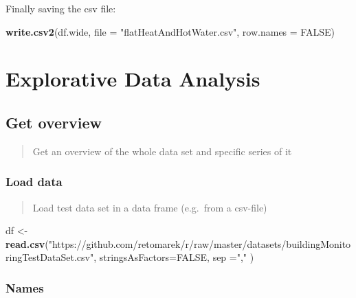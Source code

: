 \documentclass[
]{book}
\newenvironment{Shaded}{\begin{snugshade}}{\end{snugshade}}
\newcommand{\DataTypeTok}[1]{\textcolor[rgb]{0.13,0.29,0.53}{#1}}
\newcommand{\KeywordTok}[1]{\textcolor[rgb]{0.13,0.29,0.53}{\textbf{#1}}}
\newcommand{\NormalTok}[1]{#1}
\newcommand{\OtherTok}[1]{\textcolor[rgb]{0.56,0.35,0.01}{#1}}
\newcommand{\StringTok}[1]{\textcolor[rgb]{0.31,0.60,0.02}{#1}}
\let\oldShaded\Shaded
\let\endoldShaded\endShaded
\renewenvironment{Shaded}{\footnotesize\oldShaded}{\endoldShaded}
\begin{document}
Finally saving the csv file:

\begin{Shaded}
\begin{Highlighting}[]
\KeywordTok{write.csv2}\NormalTok{(df.wide,}
           \DataTypeTok{file =} \StringTok{"flatHeatAndHotWater.csv"}\NormalTok{,}
           \DataTypeTok{row.names =} \OtherTok{FALSE}\NormalTok{)}
\end{Highlighting}
\end{Shaded}

\hypertarget{explorative-data-analysis}{%
\chapter{Explorative Data Analysis}\label{explorative-data-analysis}}

\hypertarget{get-overview}{%
\section{Get overview}\label{get-overview}}

\begin{quote}
Get an overview of the whole data set and specific series of it
\end{quote}

\hypertarget{load-data}{%
\subsection{Load data}\label{load-data}}

\begin{quote}
Load test data set in a data frame (e.g.~from a csv-file)
\end{quote}

\begin{Shaded}
\begin{Highlighting}[]
\NormalTok{df <-}\StringTok{ }\KeywordTok{read.csv}\NormalTok{(}\StringTok{"https://github.com/retomarek/r/raw/master/datasets/buildingMonitoringTestDataSet.csv"}\NormalTok{,}
               \DataTypeTok{stringsAsFactors=}\OtherTok{FALSE}\NormalTok{,}
               \DataTypeTok{sep =}\StringTok{","}\NormalTok{ )}
\end{Highlighting}
\end{Shaded}

\hypertarget{names}{%
\subsection{Names}\label{names}}
\end{document}
